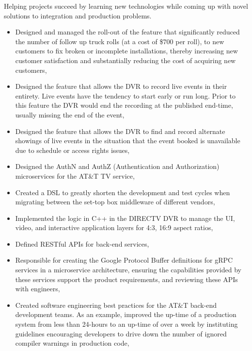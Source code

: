 
\par{ Helping projects succeed by learning new technologies while coming up with
  novel solutions to integration and production problems. }

\begin{itemize}
  \item Designed and managed the roll-out of the feature that significantly
    reduced the number of follow up truck rolls (at a cost of \$700 per roll),
    to new customers to fix broken or incomplete installations, thereby
    increasing new customer satisfaction and substantially reducing the cost of
    acquiring new customers,
  \item Designed the feature that allows the DVR to record live events in their
    entirety. Live events have the tendency to start early or run long. Prior to
    this feature the DVR would end the recording at the published end-time,
    usually missing the end of the event,
  \item Designed the feature that allows the DVR to find and record alternate
    showings of live events in the situation that the event booked is
    unavailable due to schedule or access rights issues,
  \item Designed the AuthN and AuthZ (Authentication and Authorization)
    microservices for the AT\&T TV service,
  \item Created a DSL to greatly shorten the development and test cycles when
    migrating between the set-top box middleware of different vendors,
  \item Implemented the logic in C++ in the DIRECTV DVR to manage the UI, video,
    and interactive application layers for 4:3, 16:9 aspect ratios,
  \item Defined RESTful APIs for back-end services,
  \item Responsible for creating the Google Protocol Buffer definitions for gRPC
    services in a microservice architecture, ensuring the capabilities provided
    by these services support the product requirements, and reviewing these APIs
    with engineers,
  \item Created software engineering best practices for the AT\&T back-end
    development teams. As an example, improved the up-time of a production
    system from less than 24-hours to an up-time of over a week by instituting
    guidelines encouraging developers to drive down the number of ignored
    compiler warnings in production code,

\end{itemize}
